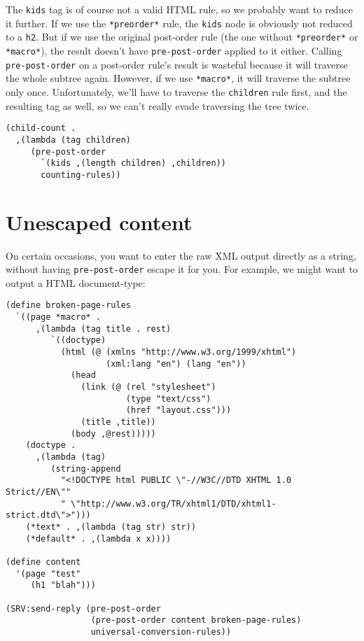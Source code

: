\documentclass{article}
\begin{document}
The \verb|kids| tag is of course not a valid HTML rule, so we probably
want to reduce it further.  If we use the \verb|*preorder*| rule, the
\verb|kids| node is obviously not reduced to a \verb|h2|.  But if we
use the original post-order rule (the one without \verb|*preorder*| or
\verb|*macro*|), the result doesn't have \verb|pre-post-order| applied
to it either.  Calling \verb|pre-post-order| on a post-order rule's
result is wasteful because it will traverse the whole subtree again.
However, if we use \verb|*macro*|, it will traverse the subtree only
once.  Unfortunately, we'll have to traverse the \verb|children| rule
first, and the resulting tag as well, so we can't really evade
traversing the tree twice.

\begin{verbatim}
(child-count .
  ,(lambda (tag children)
     (pre-post-order
       `(kids ,(length children) ,children))
       counting-rules))
\end{verbatim}


\section{Unescaped content}

On certain occasions, you want to enter the raw XML output directly as
a string, without having \verb|pre-post-order| escape it for you.  For
example, we might want to output a HTML document-type:

\begin{verbatim}
(define broken-page-rules
  `((page *macro* .
      ,(lambda (tag title . rest)
         `((doctype)
           (html (@ (xmlns "http://www.w3.org/1999/xhtml")
                    (xml:lang "en") (lang "en"))
             (head
               (link (@ (rel "stylesheet")
                        (type "text/css")
                        (href "layout.css")))
               (title ,title))
             (body ,@rest)))))
    (doctype .
      ,(lambda (tag)
         (string-append
           "<!DOCTYPE html PUBLIC \"-//W3C//DTD XHTML 1.0 Strict//EN\""
           " \"http://www.w3.org/TR/xhtml1/DTD/xhtml1-strict.dtd\">")))
    (*text* . ,(lambda (tag str) str))
    (*default* . ,(lambda x x))))

(define content
  '(page "test"
     (h1 "blah")))

(SRV:send-reply (pre-post-order
                 (pre-post-order content broken-page-rules)
                 universal-conversion-rules))
\end{verbatim}
\end{document}
